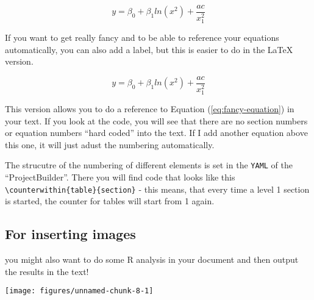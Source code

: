 \documentclass[10pt,twoside]{article}
\begin{document}
\[y = \beta_0 + \beta _1 ln(x^2) + \frac{ac}{x^2_1}\]

If you want to get really fancy and to be able to reference your
equations automatically, you can also add a label, but this is easier to
do in the LaTeX version.

\begin{equation}
y = \beta_0 + \beta _1 ln(x^2) + \frac{ac}{x^2_1}
\label{eq:fancy-equation}
\end{equation}

This version allows you to do a reference to Equation
(\ref{eq:fancy-equation}) in your text. If you look at the code, you
will see that there are no section numbers or equation numbers ``hard
coded'' into the text. If I add another equation above this one, it will
just adust the numbering automatically.

The strucutre of the numbering of different elements is set in the
\texttt{YAML} of the ``ProjectBuilder''. There you will find code that
looks like this
\texttt{\textbackslash{}counterwithin\{table\}\{section\}} - this means,
that every time a level 1 section is started, the counter for tables
will start from 1 again.

\hypertarget{for-inserting-images}{%
\subsection{For inserting images}\label{for-inserting-images}}

you might also want to do some R analysis in your document and then
output the results in the text!

\begin{center}\texttt{[image: figures/unnamed-chunk-8-1]} \end{center}

\FloatBarrier
\cleardoublepage


\fancyhead[LO,RE]{}

\listoffigures
{}

\FloatBarrier
\cleardoublepage


\listoftables
{}

\newpage
\FloatBarrier

\cleardoublepage
{}
\end{document}

